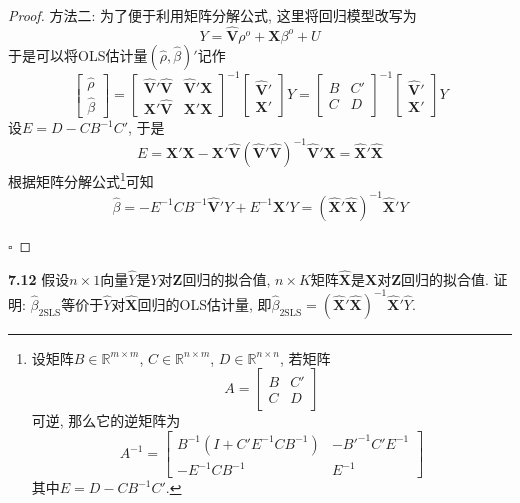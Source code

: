 \documentclass[cn,12pt,math=mtpro2,citestyle=gb7714-2015,bibstyle=gb7714-2015,twocol,mode=simple]{elegantbook}
\newcommand{\R}{\mathbb{R}}
\newcommand{\btls}{\hat{\beta}_{\text{2SLS}}}
\newcommand{\HV}{\hat{\mathbf{V}}}
\newcommand{\X}{\mathbf{X}}
\begin{document}
\begin{proof}
  方法二: 为了便于利用矩阵分解公式, 这里将回归模型改写为
  $$Y=\HV\rho^o+\X\beta^o+U$$
  于是可以将OLS估计量$(\hat{\rho},\hat{\beta})'$记作
  $$\begin{bmatrix}
      \hat{\rho} \\
      \hat{\beta}
    \end{bmatrix}=\begin{bmatrix}
                    \HV'\HV & \HV'\X \\
                    \X'\HV & \X'\X
                  \end{bmatrix}^{-1}\begin{bmatrix}
                                      \HV' \\
                                      \X'
                                    \end{bmatrix}Y=\begin{bmatrix}
                                                     B & C' \\
                                                     C & D
                                                   \end{bmatrix}^{-1}\begin{bmatrix}
                                      \HV' \\
                                      \X'
                                    \end{bmatrix}Y$$
    设$E=D-CB^{-1}C'$, 于是
    $$E=\X'\X-\X'\HV(\HV'\HV)^{-1}\HV'\X=\hat{\X}'\hat{\X}$$
    根据矩阵分解公式\footnote{设矩阵$B\in \R^{m\times m}$, $C\in\R^{n\times m}$, $D\in\R^{n\times n}$, 若矩阵
    $$A=\begin{bmatrix}
          B & C' \\
          C & D
        \end{bmatrix}$$
    可逆, 那么它的逆矩阵为
    $$A^{-1}=\begin{bmatrix}
               B^{-1}(I+C'E^{-1}CB^{-1}) & -B'^{-1}C'E^{-1} \\
               -E^{-1}CB^{-1} & E^{-1}
             \end{bmatrix}$$
    其中$E=D-CB^{-1}C'$.}可知
    $$\hat{\beta}=-E^{-1}CB^{-1}\HV' Y+E^{-1}\X' Y=(\hat{\X}'\hat{\X})^{-1}\hat{\X}'Y$$


  $\square$
\end{proof}

\textbf{7.12} 假设$n\times 1$向量$\hat{Y}$是$Y$对$\mathbf{Z}$回归的拟合值, $n\times K$矩阵$\hat{\X}$是$\X$对$\mathbf{Z}$回归的拟合值. 证明: $\btls$等价于$\hat{Y}$对$\hat{\X}$回归的OLS估计量, 即$\btls=(\hat{\X}'\hat{\X})^{-1}\hat{\X}'\hat{Y}$.
\end{document}
